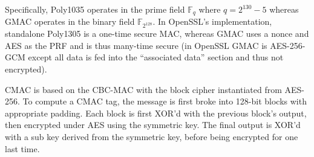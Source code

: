 \documentclass[journal=tches,submission]{iacrtrans}
\begin{document}
Specifically, Poly1035 operates in the prime field $\mathbb{F}_q$ where $q = 2^{130} - 5$ whereas GMAC operates in the binary field $\mathbb{F}_{2^{128}}$. In OpenSSL's implementation, standalone Poly1305 is a one-time secure MAC, whereas GMAC uses a nonce and AES as the PRF and is thus many-time secure (in OpenSSL GMAC is AES-256-GCM except all data is fed into the ``associated data'' section and thus not encrypted).

CMAC is based on the CBC-MAC with the block cipher instantiated from AES-256. To compute a CMAC tag, the message is first broke into 128-bit blocks with appropriate padding. Each block is first XOR'd with the previous block's output, then encrypted under AES using the symmetric key. The final output is XOR'd with a sub key derived from the symmetric key, before being encrypted for one last time. %

\end{document}
